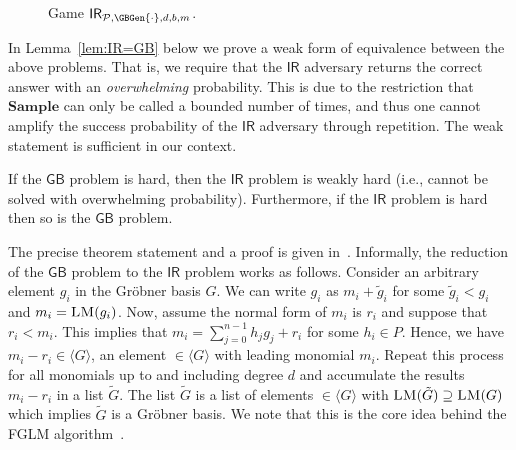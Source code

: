 \documentclass[draft]{llncs}
\newcommand{\ideal}[1]{\ensuremath{\langle #1 \rangle}\xspace}
\newcommand{\LM}[1]{\ensuremath{\textsc{LM}(#1)}\xspace}
\newcommand{\GB}{\ensuremath{\mathsf{GB}}\xspace}
\newcommand{\IR}{\ensuremath{\mathsf{IR}}\xspace}
\newcommand{\Finalize}{\mathbf{Finalize}}
\newcommand{\Sample}{\mathbf{Sample}}
\newcommand{\sample}{{\;{{\leftarrow}_\$}\;}}
\newcommand{\px}{\phantom{i}}
\begin{document}
\begin{definition}
\begin{figure}[ht]
{
}
\caption{Game $\IR_{\mathcal{P},\GBGen{\cdot},d,b,m}$.}
\label{fig.ir}
\vspace{-6mm} \end{figure}
\end{definition}
In Lemma~\ref{lem:IR=GB} below we prove a weak form of equivalence between the above problems. That is, we require that the \IR adversary returns the correct answer with an \emph{overwhelming} probability. This is due to the restriction that $\Sample$ can only be called a bounded number of times, and thus one cannot amplify the success probability of the \IR adversary through repetition. The weak statement is sufficient in our context.

\begin{lemma}
\label{lem:IR=GB}
If the \GB problem is hard, then the \IR problem is weakly hard (i.e., cannot be solved with overwhelming probability). 
Furthermore, if the \IR problem is hard then so is the \GB problem. 
\end{lemma}

The precise theorem statement and a proof is given in~\cite{full}. Informally, the reduction of the \GB problem to the \IR problem works as follows. Consider an arbitrary element $g_i$ in the Gröbner basis $G$. We can write $g_i$ as $m_i + \tilde{g}_i$ for some $\tilde{g}_i < g_i$ and $m_i = \LM{g_i}$. Now, assume the normal form of $m_i$ is $r_i$ and suppose that $r_i < m_i$. This implies that $m_i = \sum_{j=0}^{n-1} h_jg_j + r_i$ for some $h_i \in P$. Hence, we have $m_i - r_i \in \ideal{G}$, an element $\in \ideal{G}$ with leading monomial $m_i$. Repeat this process for all monomials up to and including degree $d$ and accumulate the results $m_i - r_i$ in a list $\tilde{G}$. The list $\tilde{G}$ is a list of elements $\in \ideal{G}$ with $\LM{\tilde{G}} \supseteq \LM{G}$ which implies $\tilde{G}$ is a Gröbner basis. We note that this is the core idea behind the FGLM algorithm~\cite{FGLM}. 
\end{document}
